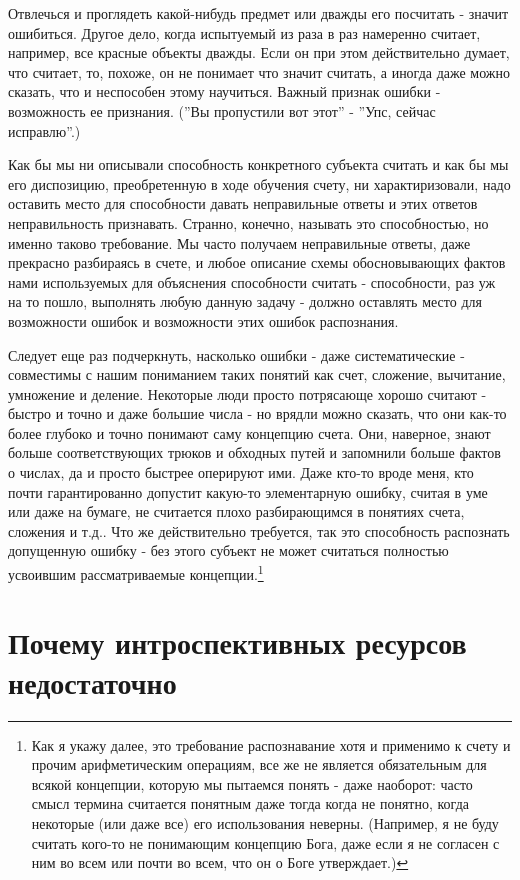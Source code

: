 \documentclass{book}
\begin{document}
Отвлечься и проглядеть какой-нибудь предмет или дважды его посчитать - значит ошибиться. Другое дело, когда испытуемый из раза в раз намеренно считает, например, все красные объекты дважды. Если он при этом действительно думает, что считает, то, похоже, он не понимает что значит считать, а иногда даже можно сказать, что и неспособен этому научиться. Важный признак ошибки - возможность ее признания. (''Вы пропустили вот этот'' - ''Упс, сейчас исправлю''.)

Как бы мы ни описывали способность конкретного субъекта считать и как бы мы его диспозицию, преобретенную в ходе обучения счету, ни характиризовали, надо оставить место для способности давать неправильные ответы и этих ответов неправильность признавать. Странно, конечно, называть это способностью, но именно таково требование. Мы часто получаем неправильные ответы, даже прекрасно разбираясь в счете, и любое описание схемы обосновывающих фактов нами используемых для объяснения способности считать - способности, раз уж на то пошло, выполнять любую данную задачу - должно оставлять место для возможности ошибок и возможности этих ошибок распознания.

Следует еще раз подчеркнуть, насколько ошибки - даже систематические - совместимы с нашим пониманием таких понятий как счет, сложение, вычитание, умножение и деление. Некоторые люди просто потрясающе хорошо считают - быстро и точно и даже большие числа - но врядли можно сказать, что они как-то более глубоко и точно понимают саму концепцию счета. Они, наверное, знают больше соответствующих трюков и обходных путей и запомнили больше фактов о числах, да и просто быстрее оперируют ими. Даже кто-то вроде меня, кто почти гарантированно допустит какую-то элементарную ошибку, считая в уме или даже на бумаге, не считается плохо разбирающимся в понятиях счета, сложения и т.д.. Что же действительно требуется, так это способность распознать допущенную ошибку - без этого субъект не может считаться полностью усвоившим рассматриваемые концепции.\footnote{Как я укажу далее, это требование распознавание хотя и применимо к счету и прочим арифметическим операциям, все же не является обязательным для всякой концепции, которую мы пытаемся понять - даже наоборот: часто смысл термина считается понятным даже тогда когда не понятно, когда некоторые (или даже все) его использования неверны. (Например, я не буду считать кого-то не понимающим концепцию Бога, даже если я не согласен с ним во всем или почти во всем, что он о Боге утверждает.)}

\section{Почему интроспективных ресурсов недостаточно}
\end{document}
